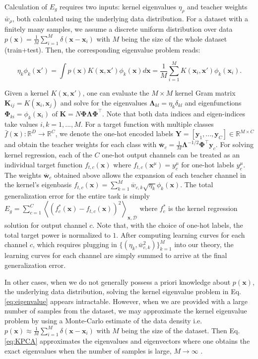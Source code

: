 \documentclass[11pt]{article}
\def\bPhi{\mathbf{\Phi}}
\def\bLambda{{\bm \Lambda}}
\def\bLambda{{\bf{H}}}
\def\bLambda{{\bm \Lambda}}
\def\w{{\mathbf w}}
\def\x{{\mathbf x}}
\def\y{{\mathbf y}}
\def\K{{\mathbf K}}
\def\Y{{\mathbf Y}}
\begin{document}
Calculation of $E_g$ requires two inputs: kernel eigenvalues $\eta_\rho$ and teacher weights $\bar w_\rho$, both calculated using the underlying data distribution. For a dataset with a finitely many samples, we assume a discrete uniform distribution over data $p(\mathbf{x}) = \frac{1}{M} \sum_{i=1}^{M} \delta(\mathbf{x}-\mathbf{x}_i)$ with $M$ being the size of the whole dataset (train+test).  Then, the corresponding eigenvalue problem reads:
\begin{linenomath*}\begin{equation}\label{eq:KPCA}
    \eta_k \phi_k(\x') = \int p(\x) K(\x,\x') \phi_k(\x) d\x = \frac{1}{M} \sum_{i=1}^M K(\x_i,\x') \phi_k(\x_i).
\end{equation}\end{linenomath*}
Given a kernel $K(\x,\x')$, one can evaluate the $M\times M$ kernel Gram matrix $\K_{ij} = K(\x_i,\x_j)$ and solve for the eigenvalues $\bLambda_{kl}=\eta_{k}\delta_{kl}$ and eigenfunctions $\bPhi_{ki} = \phi_k(\x_i)$ of $\K = N\bPhi\bLambda\bPhi^\top$. Note that both data indices and eigen-indices take values $i,k = 1,...,M$. For a target function with multiple classes $\bar f(\x):\mathbb{R}^D\to\mathbb{R}^C$, we denote the one-hot encoded labels $\Y = [\y_1,...,\y_C]\in\mathbb{R}^{M\times C}$ and obtain the teacher weights for each class with $\bar\w_c = \frac{1}{M} \mathbf{\Lambda}^{-1/2} \mathbf\Phi^\top \mathbf y_c $. For solving kernel regression, each of the $C$ one-hot output channels can be treated as an individual target function $f_{t,c}(\x)$ where $f_{t,c}(\x^\mu) = y_c^\mu$ for one-hot labels $y^\mu_c$. The weights $\overline{\w}_c$ obtained above allows the expansion of each teacher channel in the kernel's eigenbasis $f_{t,c}(\x) = \sum_{k=1}^M \overline{w}_{c,k} \sqrt{\eta_k} \phi_k(\x)$.  The total generalization error for the entire task is simply $E_g = \sum_{c=1}^C \left< (f_c^*(\x) - f_{t,c}(\x))^2 \right>_{\x,\mathcal{D}}$ where $f_c^*$ is the kernel regression solution for output channel $c$. Note that, with the choice of one-hot labels, the total target power is normalized to $1$. After computing learning curves for each channel $c$, which requires plugging in $\{(\eta_k,\overline{w}_{c,k}^2)\}_{k=1}^M$ into our theory, the learning curves for each channel are simply summed to arrive at the final generalization error.

In other cases, when we do not generally possess a priori knowledge about $p(\x)$, the underlying data distribution, solving the kernel eigenvalue problem in Eq. \eqref{eq:eigenvalue} appears intractable. However, when we are provided with a large number of samples from the dataset, we may approximate the kernel eigenvalue problem by using a Monte-Carlo estimate of the data density i.e. $p(\mathbf{x}) \approx \frac{1}{M} \sum_{i=1}^{M} \delta(\mathbf{x}-\mathbf{x}_i)$ with $M$ being the size of the dataset. Then Eq. \eqref{eq:KPCA} approximates the eigenvalues and eigenvectors where one obtains the exact eigenvalues when the number of samples is large, $M\to\infty$ \cite{RasmussenWilliams}.
\end{document}
